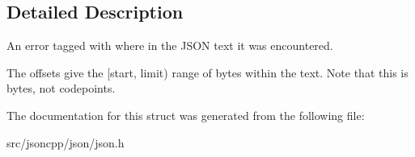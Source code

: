 \subsection{Detailed Description}
An error tagged with where in the J\+S\+ON text it was encountered. 

The offsets give the \mbox{[}start, limit) range of bytes within the text. Note that this is bytes, not codepoints. 

The documentation for this struct was generated from the following file\+:\begin{DoxyCompactItemize}
\item 
src/jsoncpp/json/json.\+h\end{DoxyCompactItemize}
